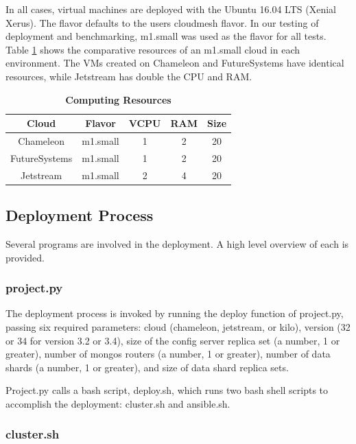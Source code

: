 \documentclass[9pt,twocolumn,twoside]{../../styles/osajnl}
\begin{document}
In all cases, virtual machines are deployed with the Ubuntu 16.04 LTS (Xenial Xerus).  The flavor defaults to the users cloudmesh flavor.  In our testing of deployment and benchmarking, m1.small was used as the flavor for all tests. Table \ref{tab:computing-resources} shows the comparative resources of an m1.small cloud in each environment. The VMs created on Chameleon and FutureSystems have identical resources, while Jetstream has double the CPU and RAM.


\begin{table}[htbp]
\centering
\caption{\bf Computing Resources}

 \begin{tabular}{|c | c | c | c| c|} 
 \hline
 
Cloud &  Flavor & VCPU & RAM & Size \\ [0.5ex] 
 \hline
    
Chameleon &  m1.small & 1 & 2 &	20 \\
 \hline
FutureSystems &  m1.small &  1 &	2 &	20 \\ 
 \hline
Jetstream &  m1.small &  2 &	4 &	20 \\ 
\hline
\end{tabular}
  \label{tab:computing-resources}
\end{table}

\subsection{Deployment Process}

Several programs are involved in the deployment.  A high level overview of each is provided.

\subsubsection{project.py}

The deployment process is invoked by running the deploy function of project.py, passing six required parameters: cloud (chameleon, jetstream, or kilo), version (32 or 34 for version 3.2 or 3.4), size of the config server replica set (a number, 1 or greater), number of mongos routers (a number, 1 or greater), number of data shards (a number, 1 or greater), and size of data shard replica sets.

Project.py calls a bash script, deploy.sh, which runs two bash shell scripts to accomplish the deployment: cluster.sh and ansible.sh.

\subsubsection{cluster.sh}
\end{document}
